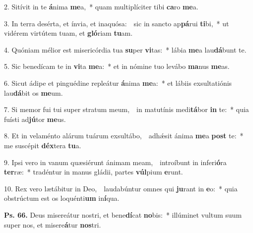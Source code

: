 
2. Sitívit in te \textbf{á}nima \textbf{me}a,~* quam multiplíciter tibi \textbf{ca}ro \textbf{me}a.

3. In terra desérta, et ínvia, et inaquósa:~\GreDagger\ sic in sancto ap\textbf{pá}rui \textbf{ti}bi,~* ut vidérem virtútem tuam, et \textbf{gló}riam \textbf{tu}am.

4. Quóniam mélior est misericórdia tua \textbf{su}per \textbf{vi}tas:~* lábia \textbf{me}a lau\textbf{dá}bunt te.

5. Sic benedícam te in \textbf{vi}ta \textbf{me}a:~* et in nómine tuo levábo \textbf{ma}nus \textbf{me}as.

6. Sicut ádipe et pinguédine repleátur \textbf{á}nima \textbf{me}a:~* et lábiis exsultatiónis lau\textbf{dá}bit os \textbf{me}um.

7. Si memor fui tui super stratum meum,~\GreDagger\ in matutínis medi\textbf{tá}bor \textbf{in} te:~* quia fuísti ad\textbf{jú}tor \textbf{me}us.

8. Et in velaménto alárum tuárum exsultábo,~\GreDagger\ adh\'{\ae}sit ánima \textbf{me}a \textbf{post} te:~* me suscépit \textbf{déx}tera \textbf{tu}a.

9. Ipsi vero in vanum quæsiérunt ánimam meam,~\GreDagger\ introíbunt in inferi\textbf{ó}ra \textbf{ter}ræ:~* tradéntur in manus gládii, partes \textbf{vúl}pium \textbf{e}runt.

10. Rex vero lætábitur in Deo,~\GreDagger\ laudabúntur omnes qui \textbf{ju}rant in \textbf{e}o:~* quia obstrúctum est os loquénti\textbf{um} in\textbf{í}qua.

\textbf{Ps. 66.} Deus misereátur nostri, et bene\textbf{dí}cat \textbf{no}bis:~* illúminet vultum suum super nos, et misere\textbf{á}tur \textbf{nos}tri.

